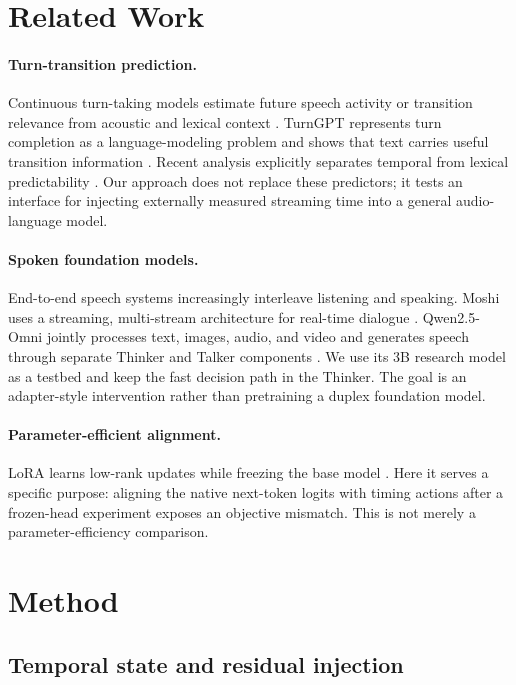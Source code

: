 \documentclass[10pt,twocolumn]{article}
\begin{document}
\section{Related Work}

\paragraph{Turn-transition prediction.}
Continuous turn-taking models estimate future speech activity or transition relevance from acoustic and lexical context \cite{skantze2017continuous,ekstedt2022vap}. TurnGPT represents turn completion as a language-modeling problem and shows that text carries useful transition information \cite{ekstedt2020turngpt}. Recent analysis explicitly separates temporal from lexical predictability \cite{leishman2026lexical}. Our approach does not replace these predictors; it tests an interface for injecting externally measured streaming time into a general audio-language model.

\paragraph{Spoken foundation models.}
End-to-end speech systems increasingly interleave listening and speaking. Moshi uses a streaming, multi-stream architecture for real-time dialogue \cite{defossez2024moshi}. Qwen2.5-Omni jointly processes text, images, audio, and video and generates speech through separate Thinker and Talker components \cite{xu2025qwenomni}. We use its 3B research model as a testbed and keep the fast decision path in the Thinker. The goal is an adapter-style intervention rather than pretraining a duplex foundation model.

\paragraph{Parameter-efficient alignment.}
LoRA learns low-rank updates while freezing the base model \cite{hu2021lora}. Here it serves a specific purpose: aligning the native next-token logits with timing actions after a frozen-head experiment exposes an objective mismatch. This is not merely a parameter-efficiency comparison.

\section{Method}

\subsection{Temporal state and residual injection}
\end{document}
